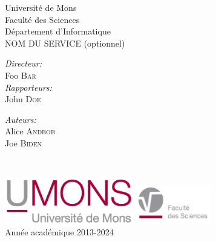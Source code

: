 \documentclass[12pt,a4paper, titlepage]{article}
\begin{document}

\begin{titlepage}
  \begin{center}
    \textnormal{\Large{Universit\'e de Mons}}\\[0.3em]
    \textnormal{\Large{Facult\'e des Sciences}}\\[0.3em]
    \textnormal{\Large{D\'epartement d'Informatique}}\\[0.3em]
    \textnormal{\Large{NOM DU SERVICE (optionnel)}}
  \end{center}
  \vspace*{3cm}
  \begin{center}
  \end{center}
  \vspace*{2cm}

  \begin{minipage}[t]{0.45\textwidth}
    \begin{flushleft} \large
      \emph{Directeur:}\\
      Foo \textsc{Bar}\\
      \emph{Rapporteurs:}\\
      John \textsc{Doe}\\
    \end{flushleft}
  \end{minipage}
  \begin{minipage}[t]{0.45\textwidth}
    \begin{flushright} \large
      \emph{Auteurs:} \\
      Alice \textsc{Andbob} \\
      Joe \textsc{Biden} \\
    \end{flushright}
  \end{minipage}\\[2ex]

  \vspace*{2cm}
  \begin{center}
    \includegraphics[height=2cm]{images/UMONS-logo.jpg}
    \hspace{3cm}
    \includegraphics[height=1.7cm]{images/FS-logo.jpg}
    \\[1em]
    Ann\'ee acad\'emique 2013-2024
  \end{center}

\end{titlepage}
\end{document}
